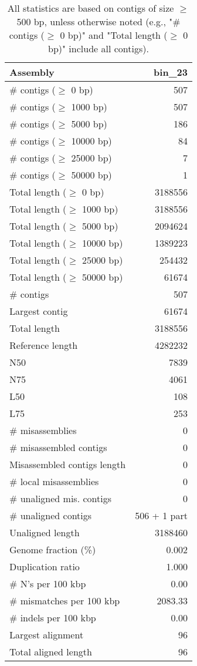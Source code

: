 \documentclass[12pt,a4paper]{article}
\begin{document}
\begin{table}[ht]
\begin{center}
\caption{All statistics are based on contigs of size $\geq$ 500 bp, unless otherwise noted (e.g., "\# contigs ($\geq$ 0 bp)" and "Total length ($\geq$ 0 bp)" include all contigs).}
\begin{tabular}{|l*{1}{|r}|}
\hline
Assembly & bin\_23 \\ \hline
\# contigs ($\geq$ 0 bp) & 507 \\ \hline
\# contigs ($\geq$ 1000 bp) & 507 \\ \hline
\# contigs ($\geq$ 5000 bp) & 186 \\ \hline
\# contigs ($\geq$ 10000 bp) & 84 \\ \hline
\# contigs ($\geq$ 25000 bp) & 7 \\ \hline
\# contigs ($\geq$ 50000 bp) & 1 \\ \hline
Total length ($\geq$ 0 bp) & 3188556 \\ \hline
Total length ($\geq$ 1000 bp) & 3188556 \\ \hline
Total length ($\geq$ 5000 bp) & 2094624 \\ \hline
Total length ($\geq$ 10000 bp) & 1389223 \\ \hline
Total length ($\geq$ 25000 bp) & 254432 \\ \hline
Total length ($\geq$ 50000 bp) & 61674 \\ \hline
\# contigs & 507 \\ \hline
Largest contig & 61674 \\ \hline
Total length & 3188556 \\ \hline
Reference length & 4282232 \\ \hline
N50 & 7839 \\ \hline
N75 & 4061 \\ \hline
L50 & 108 \\ \hline
L75 & 253 \\ \hline
\# misassemblies & 0 \\ \hline
\# misassembled contigs & 0 \\ \hline
Misassembled contigs length & 0 \\ \hline
\# local misassemblies & 0 \\ \hline
\# unaligned mis. contigs & 0 \\ \hline
\# unaligned contigs & 506 + 1 part \\ \hline
Unaligned length & 3188460 \\ \hline
Genome fraction (\%) & 0.002 \\ \hline
Duplication ratio & 1.000 \\ \hline
\# N's per 100 kbp & 0.00 \\ \hline
\# mismatches per 100 kbp & 2083.33 \\ \hline
\# indels per 100 kbp & 0.00 \\ \hline
Largest alignment & 96 \\ \hline
Total aligned length & 96 \\ \hline
\end{tabular}
\end{center}
\end{table}
\end{document}
